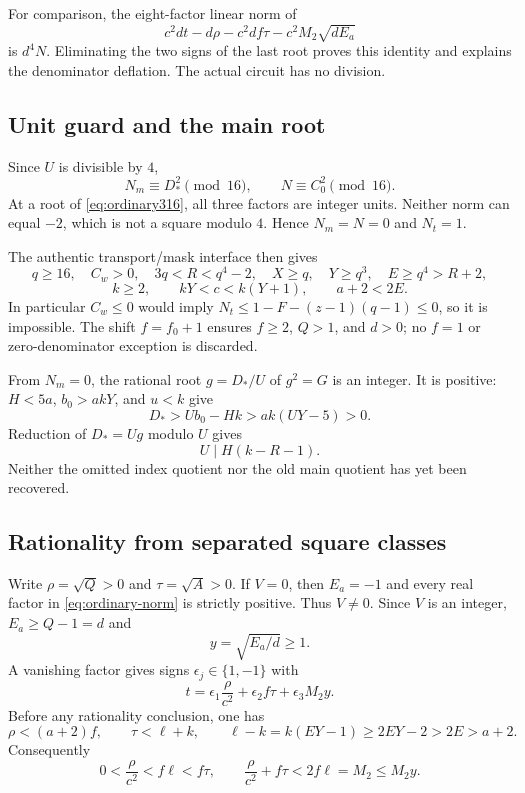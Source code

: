 For comparison, the eight-factor linear norm of
\[
 c^2dt-d\rho-c^2df\tau-c^2M_2\sqrt{dE_a}
\]
is $d^4N$. Eliminating the two signs of the last root proves this identity
and explains the denominator deflation. The actual circuit has no division.

\subsection{Unit guard and the main root}
Since $U$ is divisible by $4$,
\[
 N_m\equiv D_*^2\pmod {16},\qquad N\equiv C_0^2\pmod {16}.
\]
At a root of \eqref{eq:ordinary316}, all three factors are integer units.
Neither norm can equal $-2$, which is not a square modulo $4$. Hence
$N_m=N=0$ and $N_t=1$.

The authentic transport/mask interface then gives
\[
 q\ge16,\quad C_w>0,\quad 3q<R<q^4-2,\quad
 X\ge q,\quad Y\ge q^3,\quad E\ge q^4>R+2,
\]
\[
 k\ge2,\qquad kY<c<k(Y+1),\qquad a+2<2E.
\]
In particular $C_w\le0$ would imply
$N_t\le 1-F-(z-1)(q-1)\le0$, so it is impossible.
The shift $f=f_0+1$ ensures $f\ge2$, $Q>1$, and $d>0$;
no $f=1$ or zero-denominator exception is discarded.

From $N_m=0$, the rational root $g=D_*/U$ of $g^2=G$ is an integer.
It is positive: $H<5a$, $b_0>akY$, and $u<k$ give
\[
 D_*>Ub_0-Hk>ak(UY-5)>0.
\]
Reduction of $D_*=Ug$ modulo $U$ gives
\begin{equation}
 U\mid H(k-R-1).                                \label{eq:ordinary-absorber}
\end{equation}
Neither the omitted index quotient nor the old main quotient has yet
been recovered.

\subsection{Rationality from separated square classes}
Write $\rho=\sqrt Q>0$ and $\tau=\sqrt A>0$. If $V=0$, then $E_a=-1$
and every real factor in \eqref{eq:ordinary-norm} is strictly positive.
Thus $V\ne0$. Since $V$ is an integer, $E_a\ge Q-1=d$ and
\[
 y=\sqrt{E_a/d}\ge1.
\]
A vanishing factor gives signs $\epsilon_j\in\{1,-1\}$ with
\begin{equation}
 t=\epsilon_1\frac{\rho}{c^2}
    +\epsilon_2 f\tau+\epsilon_3 M_2y.           \label{eq:ordinary-sum}
\end{equation}
Before any rationality conclusion, one has
\[
 \rho<(a+2)f,\qquad \tau<\ell+k,\qquad
 \ell-k=k(EY-1)\ge2EY-2>2E>a+2.
\]
Consequently
\begin{equation}
 0<\frac\rho{c^2}<f\ell<f\tau,
 \qquad
 \frac\rho{c^2}+f\tau<2f\ell=M_2\le M_2y.
 \label{eq:ordinary-separation}
\end{equation}

